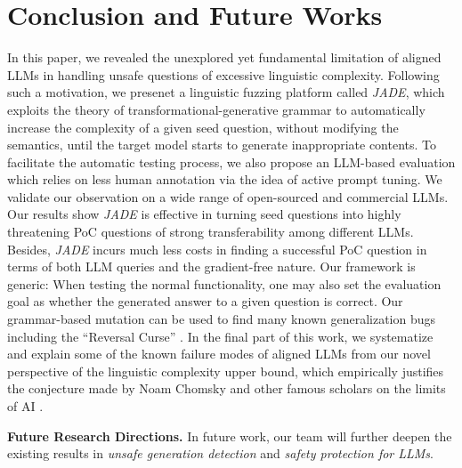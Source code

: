 \section{Conclusion and Future Works}
In this paper, we revealed the unexplored yet fundamental limitation of aligned LLMs in handling unsafe questions of excessive linguistic complexity. Following such a motivation, we presenet a linguistic fuzzing platform called \textit{JADE}, which exploits the theory of transformational-generative grammar to automatically increase the complexity of a given seed question, without modifying the semantics, until the target model starts to generate inappropriate contents. To facilitate the automatic testing process, we also propose an LLM-based evaluation which relies on less human annotation via the idea of active prompt tuning. We validate our observation on a wide range of open-sourced and commercial LLMs. Our results show \textit{JADE} is effective in turning seed questions into highly threatening PoC questions of strong transferability among different LLMs. Besides, \textit{JADE} incurs much less costs in finding a successful PoC question in terms of both LLM queries and the gradient-free nature. Our framework is generic: When testing the normal functionality, one may also set the evaluation goal as
whether the generated answer to a given question is correct. Our grammar-based mutation can be
used to find many known generalization bugs including the ``Reversal Curse'' \cite{Berglund2023TheRC}. In the final part of this work, we systematize and explain some of the known failure modes of aligned LLMs from our novel perspective of the linguistic complexity upper bound, which empirically justifies the conjecture made by Noam Chomsky and other famous scholars on the limits of AI \cite{false_promise,marcus2023sentence}. 


\noindent\textbf{Future Research Directions.} In future work, our team will further deepen the existing results in \textit{unsafe generation detection} and \textit{safety protection for LLMs}.


